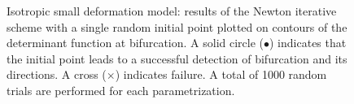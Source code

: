\documentclass[12pt]{article}
\numberwithin{equation}{section}
\begin{document}
\begin{figure}[htbp]
   \centering {}   
   \caption{Isotropic small deformation model: results of the Newton
     iterative scheme with a single random initial point plotted on
     contours of the determinant function at bifurcation. A solid
     circle ($\bullet$) indicates that the initial point leads to a
     successful detection of bifurcation and its directions. A cross
     ($\times$) indicates failure. A total of 1000 random trials are
     performed for each parametrization.}
   \label{fig:iso_shear_robust}
\end{figure}
\end{document}

